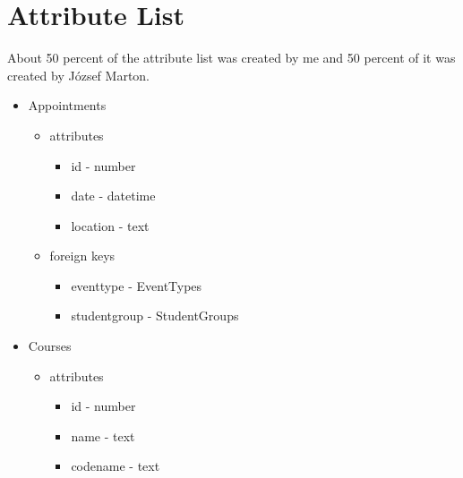 \chapter{Attribute List}
\label{attribute-list}
About 50 percent of the attribute list was created by me and 50 percent of it was created by József Marton.

\begin{itemize}
	\item Appointments
	\begin{itemize}
		\item attributes
		\begin{itemize}
			\item id - number
			\item date - datetime
			\item location - text
		\end{itemize}
		\item foreign keys
		\begin{itemize}
			\item eventtype - EventTypes
			\item studentgroup - StudentGroups
		\end{itemize}
	\end{itemize}
	
	\item Courses
	\begin{itemize}
		\item attributes
		\begin{itemize}
			\item id - number
			\item name - text
			\item codename - text
		\end{itemize}
	\end{itemize}
	

\end{itemize}
